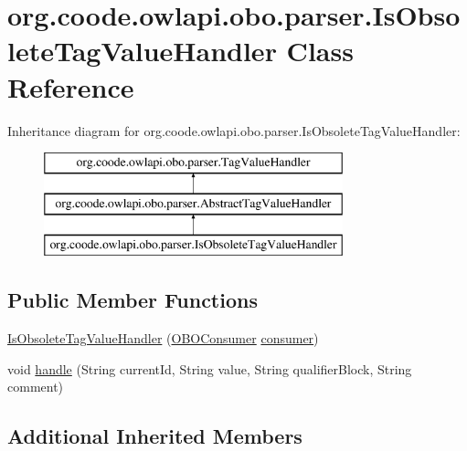 \hypertarget{classorg_1_1coode_1_1owlapi_1_1obo_1_1parser_1_1_is_obsolete_tag_value_handler}{\section{org.\-coode.\-owlapi.\-obo.\-parser.\-Is\-Obsolete\-Tag\-Value\-Handler Class Reference}
\label{classorg_1_1coode_1_1owlapi_1_1obo_1_1parser_1_1_is_obsolete_tag_value_handler}
}
Inheritance diagram for org.\-coode.\-owlapi.\-obo.\-parser.\-Is\-Obsolete\-Tag\-Value\-Handler\-:\begin{figure}[H]
\begin{center}
\leavevmode
\includegraphics[height=3.000000cm]{classorg_1_1coode_1_1owlapi_1_1obo_1_1parser_1_1_is_obsolete_tag_value_handler}
\end{center}
\end{figure}
\subsection*{Public Member Functions}
\begin{DoxyCompactItemize}
\item 
\hyperlink{classorg_1_1coode_1_1owlapi_1_1obo_1_1parser_1_1_is_obsolete_tag_value_handler_acb4e253f9f537a5e4a5484d45efce707}{Is\-Obsolete\-Tag\-Value\-Handler} (\hyperlink{classorg_1_1coode_1_1owlapi_1_1obo_1_1parser_1_1_o_b_o_consumer}{O\-B\-O\-Consumer} \hyperlink{classorg_1_1coode_1_1owlapi_1_1obo_1_1parser_1_1_abstract_tag_value_handler_ab27f1ff22d15640c5f81585f18265137}{consumer})
\item 
void \hyperlink{classorg_1_1coode_1_1owlapi_1_1obo_1_1parser_1_1_is_obsolete_tag_value_handler_a43fb8e7e217bff135ab0ad76d21244c4}{handle} (String current\-Id, String value, String qualifier\-Block, String comment)
\end{DoxyCompactItemize}
\subsection*{Additional Inherited Members}



